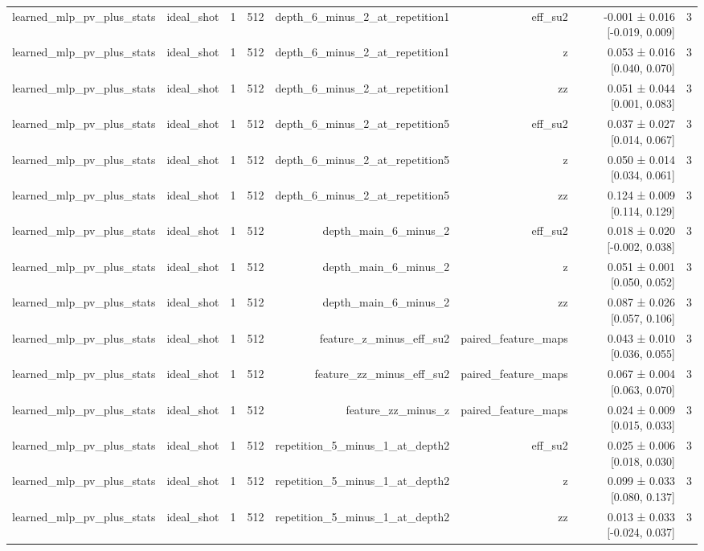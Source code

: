 \begin{table}
\begin{tabular}{lrrrrrrr}
learned\_mlp\_pv\_plus\_stats & ideal\_shot & 1 & 512 & depth\_6\_minus\_2\_at\_repetition1 & eff\_su2 & -0.001 ± 0.016 [-0.019, 0.009] & 3 \\
learned\_mlp\_pv\_plus\_stats & ideal\_shot & 1 & 512 & depth\_6\_minus\_2\_at\_repetition1 & z & 0.053 ± 0.016 [0.040, 0.070] & 3 \\
learned\_mlp\_pv\_plus\_stats & ideal\_shot & 1 & 512 & depth\_6\_minus\_2\_at\_repetition1 & zz & 0.051 ± 0.044 [0.001, 0.083] & 3 \\
learned\_mlp\_pv\_plus\_stats & ideal\_shot & 1 & 512 & depth\_6\_minus\_2\_at\_repetition5 & eff\_su2 & 0.037 ± 0.027 [0.014, 0.067] & 3 \\
learned\_mlp\_pv\_plus\_stats & ideal\_shot & 1 & 512 & depth\_6\_minus\_2\_at\_repetition5 & z & 0.050 ± 0.014 [0.034, 0.061] & 3 \\
learned\_mlp\_pv\_plus\_stats & ideal\_shot & 1 & 512 & depth\_6\_minus\_2\_at\_repetition5 & zz & 0.124 ± 0.009 [0.114, 0.129] & 3 \\
learned\_mlp\_pv\_plus\_stats & ideal\_shot & 1 & 512 & depth\_main\_6\_minus\_2 & eff\_su2 & 0.018 ± 0.020 [-0.002, 0.038] & 3 \\
learned\_mlp\_pv\_plus\_stats & ideal\_shot & 1 & 512 & depth\_main\_6\_minus\_2 & z & 0.051 ± 0.001 [0.050, 0.052] & 3 \\
learned\_mlp\_pv\_plus\_stats & ideal\_shot & 1 & 512 & depth\_main\_6\_minus\_2 & zz & 0.087 ± 0.026 [0.057, 0.106] & 3 \\
learned\_mlp\_pv\_plus\_stats & ideal\_shot & 1 & 512 & feature\_z\_minus\_eff\_su2 & paired\_feature\_maps & 0.043 ± 0.010 [0.036, 0.055] & 3 \\
learned\_mlp\_pv\_plus\_stats & ideal\_shot & 1 & 512 & feature\_zz\_minus\_eff\_su2 & paired\_feature\_maps & 0.067 ± 0.004 [0.063, 0.070] & 3 \\
learned\_mlp\_pv\_plus\_stats & ideal\_shot & 1 & 512 & feature\_zz\_minus\_z & paired\_feature\_maps & 0.024 ± 0.009 [0.015, 0.033] & 3 \\
learned\_mlp\_pv\_plus\_stats & ideal\_shot & 1 & 512 & repetition\_5\_minus\_1\_at\_depth2 & eff\_su2 & 0.025 ± 0.006 [0.018, 0.030] & 3 \\
learned\_mlp\_pv\_plus\_stats & ideal\_shot & 1 & 512 & repetition\_5\_minus\_1\_at\_depth2 & z & 0.099 ± 0.033 [0.080, 0.137] & 3 \\
learned\_mlp\_pv\_plus\_stats & ideal\_shot & 1 & 512 & repetition\_5\_minus\_1\_at\_depth2 & zz & 0.013 ± 0.033 [-0.024, 0.037] & 3 \\

\end{tabular}
\end{table}
